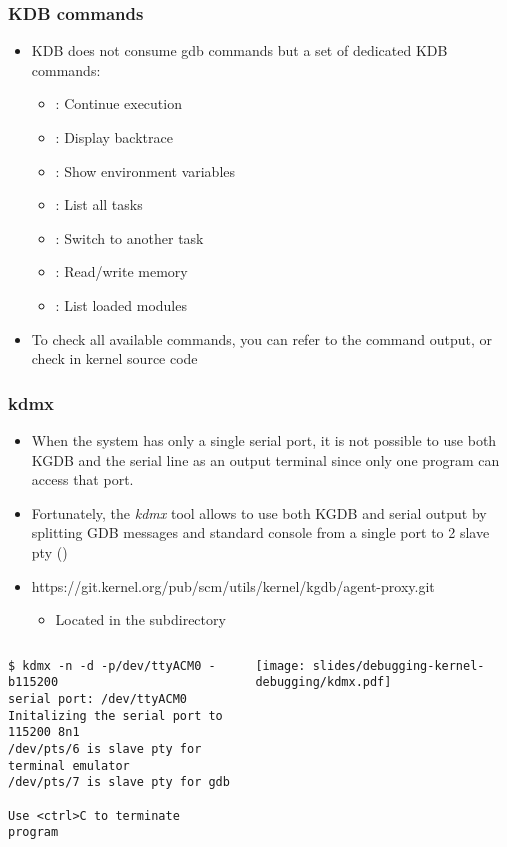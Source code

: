 \begin{frame}
  \frametitle{KDB commands}
  \begin{itemize}
    \item KDB does not consume gdb commands but a set of dedicated KDB
      commands:
      \begin{itemize}
        \item {}: Continue execution
        \item {}: Display backtrace
        \item {}: Show environment variables
        \item {}: List all tasks
        \item {}: Switch to another task
        \item {}: Read/write memory
        \item {}: List loaded modules
      \end{itemize}
    \item To check all available commands, you can refer to the 
      command output, or check  in kernel source code
  \end{itemize}
\end{frame}

\begin{frame}[fragile]
  \frametitle{kdmx}
  \begin{itemize}
    \item When the system has only a single serial port, it is not possible to
          use both KGDB and the serial line as an output terminal since only one
          program can access that port.
    \item Fortunately, the {\em kdmx} tool allows to use both KGDB and serial
          output by splitting GDB messages and standard console from a single
          port to 2 slave pty ()
    \item https://git.kernel.org/pub/scm/utils/kernel/kgdb/agent-proxy.git
    \begin{itemize}
      \item Located in the subdirectory 
    \end{itemize}
  \end{itemize}
  \begin{columns}
    \begin{block}{}
      \begin{verbatim}
$ kdmx -n -d -p/dev/ttyACM0 -b115200
serial port: /dev/ttyACM0
Initalizing the serial port to 115200 8n1
/dev/pts/6 is slave pty for terminal emulator
/dev/pts/7 is slave pty for gdb

Use <ctrl>C to terminate program
      \end{verbatim}
    \end{block}
    \texttt{[image: slides/debugging-kernel-debugging/kdmx.pdf]}
  \end{columns}
\end{frame}


